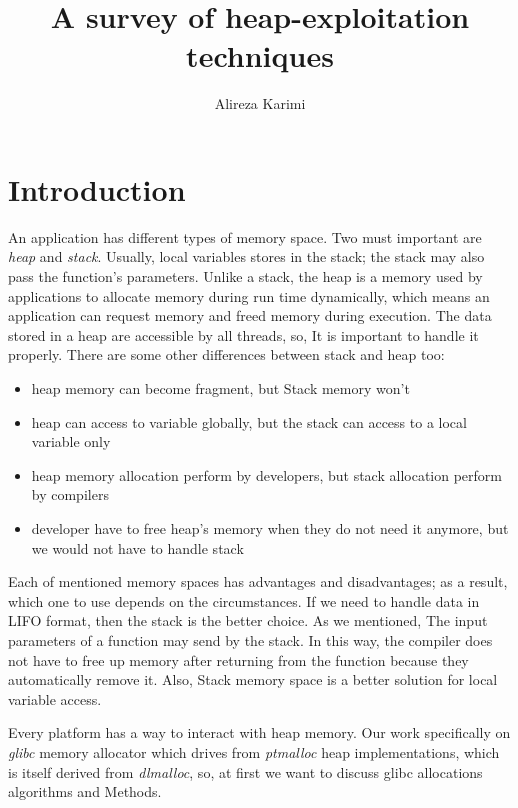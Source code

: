 \documentclass{masterthesis}
\newcommand*\libc{glibc}
\begin{document}
\title{A survey of heap-exploitation techniques}

\author{Alireza Karimi}



\maketitle

\tableofcontents

\chapter{Introduction}

An application has different types of memory space. Two must important are \emph{heap} and \emph{stack}. Usually, local variables stores in the stack; the stack may also pass the function's parameters. Unlike a stack, the heap is a memory used by applications to allocate memory during run time dynamically, which means an application can request memory and freed memory during execution. The data stored in a heap are accessible by all threads, so, It is important to handle it properly. There are some other differences between stack and heap too:
\begin{itemize}
	\item heap memory can become fragment, but Stack memory won't
	\item heap can access to variable globally, but the stack can access to a local variable only
	\item heap memory allocation perform by developers, but stack allocation perform by compilers
	\item developer have to free heap's memory when they do not need it anymore, but we would not have to handle stack
\end{itemize}
Each of mentioned memory spaces has advantages and disadvantages; as a result, which one to use depends on the circumstances. If we need to handle data in LIFO format, then the stack is the better choice. As we mentioned, The input parameters of a function may send by the stack. In this way, the compiler does not have to free up memory after returning from the function because they automatically remove it. Also, Stack memory space is a better solution for local variable access.

Every platform has a way to interact with heap memory. Our work specifically on \emph{ \libc{}} memory allocator which drives from \emph{ptmalloc} heap implementations, which is itself derived from \emph{dlmalloc}, so, at first we want to discuss \libc{} allocations algorithms and Methods. 
\end{document}

